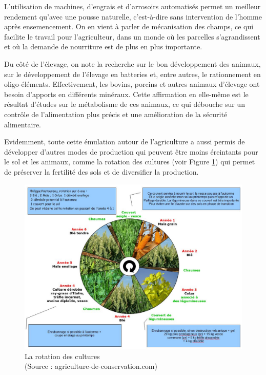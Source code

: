 \documentclass[a4paper,12pt]{report}
\begin{document}
			L’utilisation de machines, d’engrais et d’arrosoirs automatisés permet un meilleur rendement qu’avec une pousse naturelle, c’est-à-dire sans intervention de l’homme après ensemencement. On en vient à parler de mécanisation des champs, ce qui facilite le travail pour l’agriculteur, dans un monde où les parcelles s’agrandissent et où la demande de nourriture est de plus en plus importante.
			
			Du côté de l’élevage, on note la recherche sur le bon développement des animaux, sur le développement de l’élevage en batteries et, entre autres, le rationnement en oligo-éléments\cite{OligoElements}. Effectivement, les bovins, porcins et autres animaux d’élevage ont besoin d’apports en différents minéraux. Cette affirmation en elle-même est le résultat d’études sur le métabolisme de ces animaux, ce qui débouche sur un contrôle de l’alimentation plus précis et une amélioration de la sécurité alimentaire.
			
			Evidemment, toute cette émulation autour de l’agriculture a aussi permis de développer d’autres modes de production qui peuvent être moins éreintants pour le sol et les animaux, comme la rotation des cultures (voir Figure \ref{Rotation}) qui permet de préserver la fertilité des sols et de diversifier la production.
			
			\begin{figure}[!h]
			\centering
			\includegraphics[scale=0.6]{Illustrations/Rotation.jpg}
			\caption{La rotation des cultures\\(Source : agriculture-de-conservation.com\cite{RotationSite})}
			\label{Rotation}
			\end{figure}
			
\end{document}
